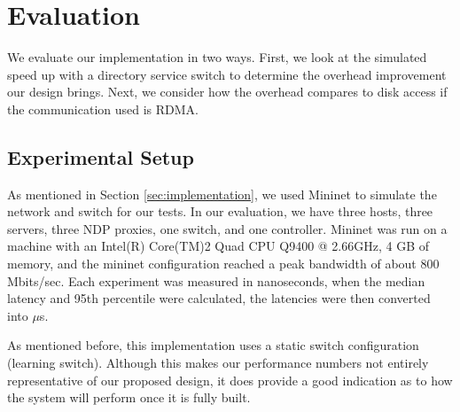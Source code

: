 \section{Evaluation}
\label{sec:eval}
We evaluate our implementation in two ways. First, we look at the simulated speed up with a directory service switch to determine the overhead improvement our design brings. Next, we consider how the overhead compares to disk access if the communication used is RDMA. 


\subsection{Experimental Setup}
As mentioned in Section \ref{sec:implementation}, we used Mininet to simulate the network and switch for our tests. In our evaluation, we have three hosts, three servers, three NDP proxies, one switch, and one controller. Mininet was run on a machine with an Intel(R) Core(TM)2 Quad CPU Q9400 @ 2.66GHz, 4 GB of memory, and the mininet configuration reached a peak bandwidth of about 800 Mbits/sec. Each experiment was measured in nanoseconds, when the median latency and 95th percentile were calculated, the latencies were then converted into $\mu$s.

As mentioned before, this implementation uses a static switch configuration (learning switch). Although this makes our performance numbers not entirely representative of our proposed design, it does provide a good indication as to how the system will perform once it is fully built. 


